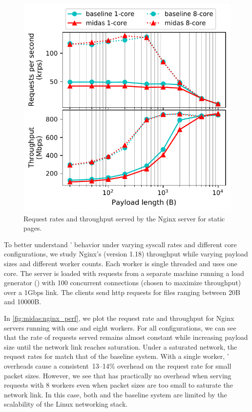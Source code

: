 \begin{figure}[ht!]
  \centering
  \includegraphics[width=0.75\linewidth]{media/midas/nginx_performance.pdf}
  \caption[\midas: Request rates and throughput for the Nginx server]
          {Request rates and throughput served by the Nginx server for
          static pages.}
  \label{fig:midas:nginx_perf}
\end{figure}

To better understand \midas' behavior under varying syscall
rates and different core configurations, we study Nginx's (version 1.18)
throughput while varying payload sizes and different worker counts.
Each worker is single threaded and uses one core.
The server is loaded with requests from a separate machine running
a load generator () with 100 concurrent
connections (chosen to maximize throughput) over a 1Gbps link.
The clients send http requests for files ranging between 20B and
10000B.

In \autoref{fig:midas:nginx_perf}, we plot the request rate and throughput
for Nginx servers running with one and eight workers.
For all configurations, we can see that the rate of requests served
remains almost constant while increasing payload size until the network
link reaches saturation.
Under a saturated network, the request rates for \midas match that
of the baseline system.
With a single worker, \midas' overheads cause a consistent~13--14\%
overhead on the request rate for small packet sizes.
However, we see that \midas has practically no overhead when serving
requests with 8 workers even when packet sizes are too small to
saturate the network link.
In this case, both \midas and the baseline system are limited by the
scalability of the Linux networking stack.

